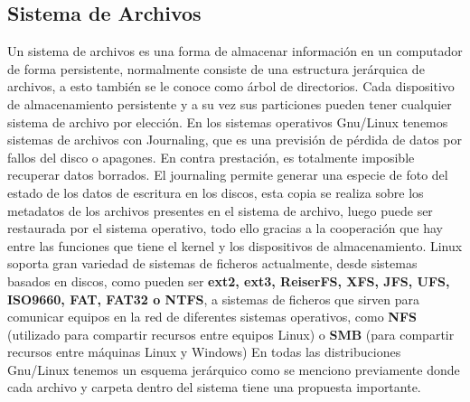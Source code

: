 \documentclass[paper=a4, fontsize=12pt]{article} 		%
\numberwithin{equation}{section}						%
\numberwithin{table}{section} 							%
\begin{document}
\subsection{Sistema de Archivos}
Un sistema de archivos es una forma de almacenar información en un computador de forma persistente, normalmente consiste de una estructura jerárquica de archivos, a esto también se le conoce como árbol de directorios. Cada dispositivo de almacenamiento persistente y a su vez sus particiones pueden tener cualquier sistema de archivo por elección. En los sistemas operativos Gnu/Linux tenemos sistemas de archivos con Journaling, que es una previsión de pérdida de datos por fallos del disco o apagones. En contra prestación, es totalmente imposible recuperar datos borrados. 
El journaling permite generar una especie de foto del estado de los datos de escritura en los discos, esta copia se realiza sobre los metadatos de los archivos presentes en el sistema de archivo, luego puede ser restaurada por el sistema operativo, todo ello gracias a la cooperación que hay entre las funciones que tiene el kernel y los dispositivos de almacenamiento.
Linux soporta gran variedad de sistemas de ficheros actualmente, desde sistemas basados en discos, como pueden ser \textbf{ext2, ext3, ReiserFS, XFS, JFS, UFS, ISO9660, FAT, FAT32 o NTFS}, a sistemas de ficheros que sirven para comunicar equipos en la red de diferentes sistemas operativos, como \textbf{NFS} (utilizado para compartir recursos entre equipos Linux) o \textbf{SMB} (para compartir recursos entre máquinas Linux y Windows)
En todas las distribuciones  Gnu/Linux tenemos un esquema jerárquico como se menciono previamente donde cada archivo y carpeta dentro del sistema tiene una propuesta importante. 
\begin{figure}[H]
 	\centering
\end{figure}
\end{document}
